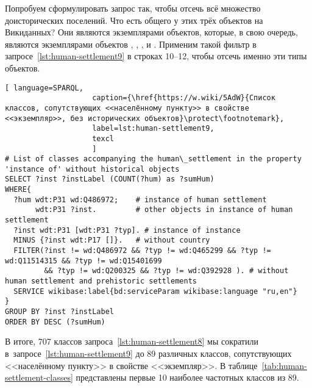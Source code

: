 Попробуем сформулировать запрос так, чтобы отсечь всё множество доисторических поселений.  
Что есть общего у этих трёх объектов на Викиданных? 
Они являются экземплярами объектов, которые, в свою очередь, 
являются экземплярами объектов , 
, 
, 
и . 
Применим такой фильтр в запросе~\ref{lst:human-settlement9} в строках 10--12, 
чтобы отсечь именно эти типы объектов.

\begin{fullwidth}
\lstset{numbers=left, firstnumber=1, frame=single}
\begin{lstlisting}[ language=SPARQL, 
                    caption={\href{https://w.wiki/5AdW}{Cписок классов, сопутствующих <<населённому пункту>> в свойстве <<экземпляр>>, без исторических объектов}\protect\footnotemark},
                    label=lst:human-settlement9,
                    texcl 
                    ]
# List of classes accompanying the human\_settlement in the property 'instance of' without historical objects 
SELECT ?inst ?instLabel (COUNT(?hum) as ?sumHum)
WHERE{
  ?hum wdt:P31 wd:Q486972;    # instance of human settlement
       wdt:P31 ?inst.         # other objects in instance of human settlement
  ?inst wdt:P31 [wdt:P31 ?typ]. # instance of instance
  MINUS {?inst wdt:P17 []}.   # without country
  FILTER(?inst != wd:Q486972 && ?typ != wd:Q465299 && ?typ != wd:Q11514315 && ?typ != wd:Q15401699 
         && ?typ != wd:Q200325 && ?typ != wd:Q392928 ). # without human settlement and prehistoric settlements
  SERVICE wikibase:label{bd:serviceParam wikibase:language "ru,en"}
}
GROUP BY ?inst ?instLabel
ORDER BY DESC (?sumHum)
\end{lstlisting}%
\end{fullwidth}

В итоге, 707 классов запроса~\ref{lst:human-settlement8} 
мы сократили в~запросе~\ref{lst:human-settlement9} 
до 89 различных классов, сопутствующих <<населённому пункту>> в свойстве <<экземпляр>>. 
В таблице~\ref{tab:human-settlement-classes} представлены первые 10 наиболее частотных классов из 89. 


